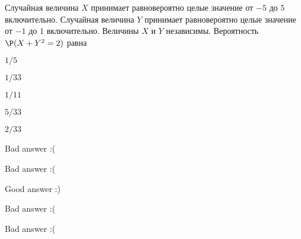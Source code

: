 
\begin{question}
Случайная величина \(X\) принимает равновероятно целые значение от
\(-5\) до \(5\) включительно. Случайная величина \(Y\) принимает
равновероятно целые значение от \(-1\) до \(1\) включительно. Величины
\(X\) и \(Y\) независимы. Вероятность \(\P(X+Y^2=2)\) равна
\begin{answerlist}
  \item \(1/5\)
  \item \(1/33\)
  \item \(1/11\)
  \item \(5/33\)
  \item \(2/33\)
\end{answerlist}
\end{question}

\begin{solution}
\begin{answerlist}
  \item Bad answer :(
  \item Bad answer :(
  \item Good answer :)
  \item Bad answer :(
  \item Bad answer :(
\end{answerlist}
\end{solution}

